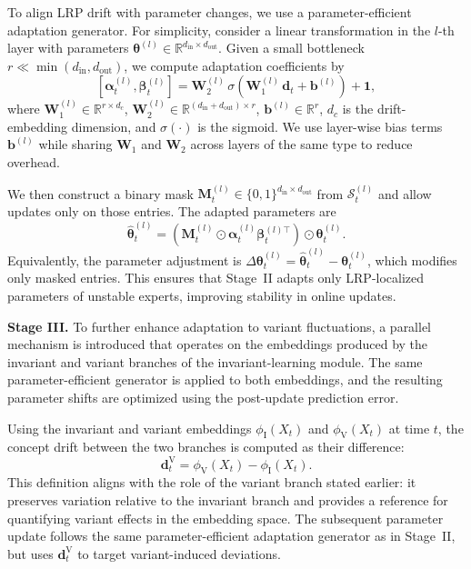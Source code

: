 ﻿\documentclass[journal]{IEEEtran}
\newenvironment{auditproblemblock}{\begingroup\color{red}}{\endgroup}
\begin{document}
\begin{auditproblemblock}
To align LRP drift with parameter changes, we use a parameter-efficient adaptation generator. For simplicity, consider a linear transformation in the $l$-th layer with parameters $\boldsymbol{\theta}^{(l)}\in\mathbb{R}^{d_{\mathrm{in}}\times d_{\mathrm{out}}}$. Given a small bottleneck $r\ll\min(d_{\mathrm{in}},d_{\mathrm{out}})$, we compute adaptation coefficients by
\begin{equation}
\left[{\boldsymbol{\alpha}}^{(l)}_t,{\boldsymbol{\beta}}^{(l)}_t\right]
=\mathbf{W}^{(l)}_2\,\sigma\!\left(\mathbf{W}^{(l)}_1\,\mathbf{d}_t+\mathbf{b}^{(l)}\right)+\mathbf{1},
\end{equation}
where $\mathbf{W}^{(l)}_1\in\mathbb{R}^{r\times d_c}$, $\mathbf{W}^{(l)}_2\in\mathbb{R}^{(d_{\mathrm{in}}+d_{\mathrm{out}})\times r}$, $\mathbf{b}^{(l)}\in\mathbb{R}^{r}$, $d_c$ is the drift-embedding dimension, and $\sigma(\cdot)$ is the sigmoid. We use layer-wise bias terms $\mathbf{b}^{(l)}$ while sharing $\mathbf{W}_1$ and $\mathbf{W}_2$ across layers of the same type to reduce overhead.

We then construct a binary mask $\mathbf{M}_t^{(l)}\in\{0,1\}^{d_{\mathrm{in}}\times d_{\mathrm{out}}}$ from $\mathcal{S}_t^{(l)}$ and allow updates only on those entries. The adapted parameters are
\begin{equation}
\widehat{\boldsymbol{\theta}}^{(l)}_t=\left(\mathbf{M}_t^{(l)}\odot {\boldsymbol{\alpha}}^{(l)}_t {\boldsymbol{\beta}}^{(l)\top}_t\right)\odot \boldsymbol{\theta}_t^{(l)}.
\end{equation}
Equivalently, the parameter adjustment is $\Delta\boldsymbol{\theta}^{(l)}_t=\widehat{\boldsymbol{\theta}}^{(l)}_t-\boldsymbol{\theta}_t^{(l)}$, which modifies only masked entries. This ensures that Stage~II adapts only LRP-localized parameters of unstable experts, improving stability in online updates. 

\textbf{Stage III.} To further enhance adaptation to variant fluctuations, a parallel mechanism is introduced that operates on the embeddings produced by the invariant and variant branches of the invariant-learning module. The same parameter-efficient generator is applied to both embeddings, and the resulting parameter shifts are optimized using the post-update prediction error.

Using the invariant and variant embeddings $\phi_{\mathrm{I}}(X_t)$ and $\phi_{\mathrm{V}}(X_t)$ at time $t$, the concept drift between the two branches is computed as their difference:
\begin{equation}
\mathbf{d}^{\mathrm{V}}_t=\phi_{\mathrm{V}}(X_t)-\phi_{\mathrm{I}}(X_t).
\end{equation}
This definition aligns with the role of the variant branch stated earlier: it preserves variation relative to the invariant branch and provides a reference for quantifying variant effects in the embedding space. The subsequent parameter update follows the same parameter-efficient adaptation generator as in Stage~II, but uses $\mathbf{d}^{\mathrm{V}}_t$ to target variant-induced deviations.


\end{auditproblemblock}
\end{document}

